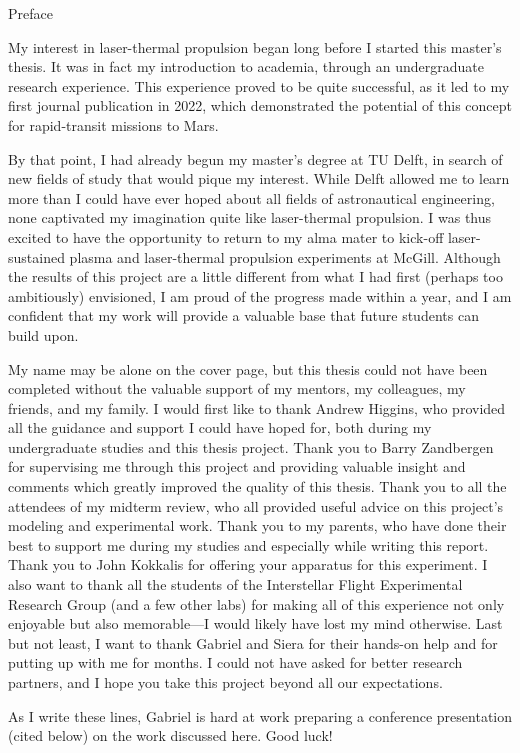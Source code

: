 \begin{plainchp}{Preface}
    \begin{refsection}
    My interest in laser-thermal propulsion began long before I started this master's thesis. It was in fact my introduction to academia, through an undergraduate research experience. This experience proved to be quite successful, as it led to my first journal publication in 2022, which demonstrated the potential of this concept for rapid-transit missions to Mars.
    
    By that point, I had already begun my master's degree at TU Delft, in search of new fields of study that would pique my interest. While Delft allowed me to learn more than I could have ever hoped about all fields of astronautical engineering, none captivated my imagination quite like laser-thermal propulsion. I was thus excited to have the opportunity to return to my alma mater to kick-off laser-sustained plasma and laser-thermal propulsion experiments at McGill. Although the results of this project are a little different from what I had first (perhaps too ambitiously) envisioned, I am proud of the progress made within a year, and I am confident that my work will provide a valuable base that future students can build upon.

    My name may be alone on the cover page, but this thesis could not have been completed without the valuable support of my mentors, my colleagues, my friends, and my family. I would first like to thank Andrew Higgins, who provided all the guidance and support I could have hoped for, both during my undergraduate studies and this thesis project. Thank you to Barry Zandbergen for supervising me through this project and providing valuable insight and comments which greatly improved the quality of this thesis. Thank you to all the attendees of my midterm review, who all provided useful advice on this project's modeling and experimental work. Thank you to my parents, who have done their best to support me during my studies and especially while writing this report. Thank you to John Kokkalis for offering your apparatus for this experiment. I also want to thank all the students of the Interstellar Flight Experimental Research Group (and a few other labs) for making all of this experience not only enjoyable but also memorable---I would likely have lost my mind otherwise. Last but not least, I want to thank Gabriel and Siera for their hands-on help and for putting up with me for months. I could not have asked for better research partners, and I hope you take this project beyond all our expectations.

    As I write these lines, Gabriel is hard at work preparing a conference presentation (cited below) on the work discussed here. Good luck!

    \end{refsection}
\end{plainchp}